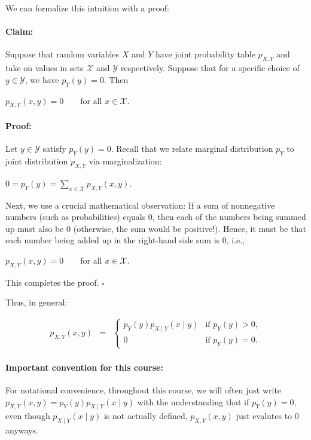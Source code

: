 \documentclass[6008notes.tex]{subfiles}
\begin{document}
We can formalize this intuition with a proof:

\paragraph{Claim:} Suppose that random variables $X$ and $Y$ have joint probability table $p_{X,Y}$ and take on values in sets $\mathcal{X}$ and $\mathcal{Y}$ respectively. Suppose that for a specific choice of $y\in \mathcal{Y}$, we have $p_{Y}(y)=0$. Then

{\centering$p_{X,Y}(x,y)=0\qquad \text {for all }x\in \mathcal{X}.$ \par}
 
\paragraph{Proof:} Let $y\in \mathcal{Y}$ satisfy $p_{Y}(y)=0$. Recall that we relate marginal distribution $p_Y$ to joint distribution $p_{X,Y}$ via marginalization:

{\centering$0=p_{Y}(y)=\sum _{x\in \mathcal{X}}p_{X,Y}(x,y).$ \par}
 
Next, we use a crucial mathematical observation: If a sum of nonnegative numbers (such as probabilities) equals 0, then each of the numbers being summed up must also be 0 (otherwise, the sum would be positive!). Hence, it must be that each number being added up in the right-hand side sum is 0, i.e.,

{\centering$p_{X,Y}(x,y)=0\qquad \text {for all }x\in \mathcal{X}.$ \par}
 
This completes the proof. $\square$

Thus, in general:

\begin{eqnarray*}
p_{X,Y}(x,y)
&=&
\begin{cases}
p_{Y}(y)p_{X\mid Y}(x\mid y) & \text{if }p_{Y}(y)>0,\\
0 & \text{if }p_{Y}(y)=0.
\end{cases}
\end{eqnarray*}

\paragraph{Important convention for this course:} For notational convenience, throughout this course, we will often just write $p_{X,Y}(x,y)=p_{Y}(y)p_{X\mid Y}(x\mid y)$ with the understanding that if $p_{Y}(y)=0$, even though $p_{X\mid Y}(x\mid y)$ is not actually defined, $p_{X,Y}(x,y)$ just evalutes to 0 anyways.
\end{document}
